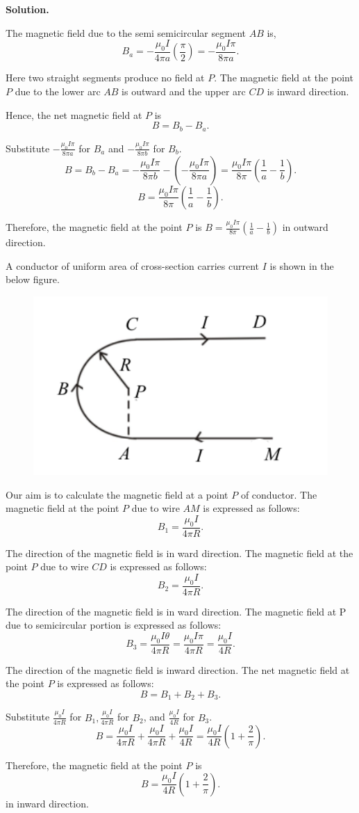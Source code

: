 \documentclass[12pt, a4paper, oneside]{report}
\newenvironment{solution}{
  \par\medskip\noindent
  \textbf{Solution.}\quad\itshape
  \par\noindent\makebox[\linewidth]{\rule{\textwidth}{0.4pt}}
}{
  \par\noindent\makebox[\linewidth]{\rule{\textwidth}{0.4pt}}
  \par\medskip
}
\begin{document}
\begin{solution}
The magnetic field due to the semi semicircular segment $A B$ is,
$$
B_a =-\frac{\mu_0 I}{4 \pi a}\left(\frac{\pi}{2}\right)  =-\frac{\mu_0 I \pi}{8 \pi a}.
$$

Here two straight segments produce no field at $P$. The magnetic field at the point $P$ due to the lower arc $A B$ is outward and the upper arc $C D$ is inward direction.

Hence, the net magnetic field at $P$ is
$$
B=B_b-B_a.
$$

Substitute $-\frac{\mu_0 I \pi}{8 \pi a}$ for $B_a$ and $-\frac{\mu_0 I \pi}{8 \pi b}$ for $B_b$.
$$
B =B_b-B_a =-\frac{\mu_0 I \pi}{8 \pi b}-\left(-\frac{\mu_0 I \pi}{8 \pi a}\right) =\frac{\mu_0 I \pi}{8 \pi}\left(\frac{1}{a}-\frac{1}{b}\right).
$$
$$
B=\frac{\mu_0 I \pi}{8 \pi}\left(\frac{1}{a}-\frac{1}{b}\right).
$$

Therefore, the magnetic field at the point $P$ is $B=\frac{\mu_0 I \pi}{8 \pi}\left(\frac{1}{a}-\frac{1}{b}\right)$ in outward direction.

A conductor of uniform area of cross-section carries current $I$ is shown in the below figure.

\begin{figure}
    \centering
    \includegraphics[width=0.5\linewidth]{6.png}
    \caption{}
    \label{fig:enter-label}
\end{figure}

Our aim is to calculate the magnetic field at a point $P$ of conductor.
The magnetic field at the point $P$ due to wire $A M$ is expressed as follows:
$$
B_1=\frac{\mu_0 I}{4 \pi R}.
$$

The direction of the magnetic field is in ward direction.
The magnetic field at the point $P$ due to wire $C D$ is expressed as follows:
$$
B_2=\frac{\mu_0 I}{4 \pi R}.
$$

The direction of the magnetic field is in ward direction.
The magnetic field at $\mathrm{P}$ due to semicircular portion is expressed as follows:
$$
B_3  =\frac{\mu_0 I \theta}{4 \pi R} =\frac{\mu_0 I \pi}{4 \pi R} =\frac{\mu_0 I}{4 R}.
$$

The direction of the magnetic field is inward direction.
The net magnetic field at the point $P$ is expressed as follows:
$$
B=B_1+B_2+B_3.
$$

Substitute $\frac{\mu_0 I}{4 \pi R}$ for $B_1, \frac{\mu_0 I}{4 \pi R}$ for $B_2$, and $\frac{\mu_0 I}{4 R}$ for $B_3$.
$$
B  =\frac{\mu_0 I}{4 \pi R}+\frac{\mu_0 I}{4 \pi R}+\frac{\mu_0 I}{4 R} =\frac{\mu_0 I}{4 R}\left(1+\frac{2}{\pi}\right).
$$

Therefore, the magnetic field at the point $P$ is
$$
B=\frac{\mu_0 I}{4 R}\left(1+\frac{2}{\pi}\right).
$$
in inward direction.
\end{solution}
\end{document}
